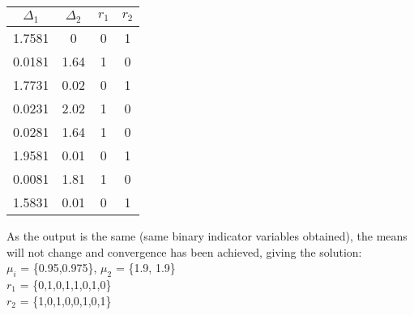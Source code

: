 \begin{center}
 \begin{tabular}{||c c c c||} 
 \hline
 $\Delta_1$ & $\Delta_2$ & $r_1$ & $r_2$  \\ [0.5ex] 
 \hline\hline
 1.7581 & 0 & 0 & 1 \\ 
 \hline
 0.0181 & 1.64  & 1 & 0 \\ 
 \hline
1.7731 & 0.02 & 0 & 1 \\
 \hline
0.0231 & 2.02 & 1 & 0 \\
 \hline
 0.0281 & 1.64 & 1 & 0 \\ 
  \hline
1.9581 & 0.01 & 0 & 1 \\
 \hline
0.0081 & 1.81 & 1 & 0 \\
 \hline
 1.5831 & 0.01 & 0 & 1 \\ [1ex] 
 \hline
\end{tabular}
\end{center}
As the output is the same (same binary indicator variables obtained), the means will not change and convergence has been achieved, giving the solution: \\
$\mu_i$ = \{0.95,0.975\}, $\mu_2$ = \{1.9, 1.9\} \\
$r_1$ = \{0,1,0,1,1,0,1,0\} \\
$r_2$ = \{1,0,1,0,0,1,0,1\} \\